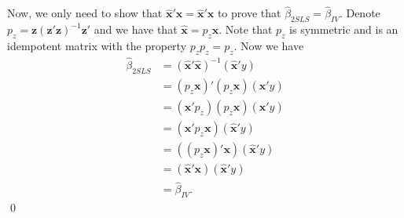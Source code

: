 \documentclass[10pt]{article}
\begin{document}
Now, we only need to show that $\hat{\textbf{x}}'\hat{\textbf{x}}=\hat{\textbf{x}}'\textbf{x}$ to prove that $\hat{\beta}_{2SLS}=\hat{\beta}_{IV}.$ Denote $p_z=\textbf{z}(\textbf{z}'\textbf{z})^{-1}\textbf{z}'$ and we have that $\hat{\textbf{x}}=p_z\textbf{x}$. Note that $p_z$ is symmetric and is an idempotent matrix with the property $p_zp_z=p_z$. Now we have
\begin{align*}
    \hat{\beta}_{2SLS}&=(\hat{\textbf{x}}'\hat{\textbf{x}})^{-1}(\hat{\textbf{x}}'y)\\
    &=(p_z \textbf{x})'(p_z \textbf{x})(\hat{\textbf{x}}'y)\\
    &=(\textbf{x}'p_z)(p_z \textbf{x})(\hat{\textbf{x}}'y)\\
    &=(\textbf{x}'p_z \textbf{x})(\hat{\textbf{x}}'y)\\
    &=((p_z\textbf{x})' \textbf{x})(\hat{\textbf{x}}'y)\\
    &=(\hat{\textbf{x}}' \textbf{x})(\hat{\textbf{x}}'y)\\
    &=\hat{\beta}_{IV}.
\end{align*}\qed
\end{document}
